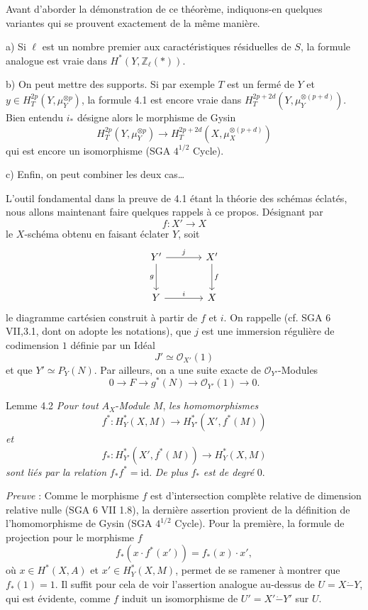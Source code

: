 Avant d'aborder la démonstration de ce théorème, indiquons-en quelques variantes qui se prouvent exactement de la même manière.

a) Si $\ell$ est un nombre premier aux caractéristiques résiduelles de $S$, la formule analogue est vraie dans $H^*(Y,\mathbb{Z}_\ell(*))$.

b) On peut mettre des supports. Si par exemple $T$ est un fermé de $Y$ et $y\in H_T^{2p}(Y,\mu_Y^{\otimes p})$, la formule 4.1 est encore vraie dans $H_T^{2p+2d}(Y,\mu_Y^{\otimes(p+d)})$. Bien entendu $i_*$ désigne alors le morphisme de Gysin
\[
H_T^{2p}(Y,\mu_Y^{\otimes p})
\to H_T^{2p+2d}(X,\mu_X^{\otimes(p+d)})
\]
qui est
encore un isomorphisme (SGA $4^{1/2}$ Cycle).

c) Enfin, on peut combiner les deux cas\dots

L'outil fondamental dans la preuve de 4.1 étant la théorie des schémas éclatés, nous allons maintenant faire quelques rappels à ce propos. Désignant par
\[
f:X'\to X
\]
le $X$-schéma obtenu en faisant éclater $Y$, soit
\[
\begin{tikzcd}[column sep=large,row sep=large]
Y' \arrow[r,"j"] \arrow[d,"g"'] & X' \arrow[d,"f"]\\
Y \arrow[r,"i"] & X
\end{tikzcd}
\]
le diagramme cartésien construit à partir de $f$ et $i$. On rappelle (cf. SGA 6 VII,3.1, dont on adopte les notations), que $j$ est une immersion régulière de codimension $1$ définie par un Idéal
\[
J'\simeq\mathcal{O}_{X'}(1)
\]
et que $Y'\simeq P_Y(N)$. Par ailleurs, on a une suite exacte de $\mathcal{O}_{Y'}$-Modules
\[
0\to F\to g^*(N)\to \mathcal{O}_{Y'}(1)\to0.
\]

\begin{statement}{Lemme 4.2}
\emph{Pour tout} $A_X$-\emph{Module} $M$, \emph{les homomorphismes}
\[
f^*:H_Y^*(X,M)\to H_{Y'}^*(X',f^*(M))
\]
\emph{et}
\[
f_*:H_{Y'}^*(X',f^*(M))\to H_Y^*(X,M)
\]
\emph{sont liés par la relation} $f_*f^*=\mathrm{id}$. \emph{De plus} $f_*$ \emph{est de degré} $0$.
\end{statement}

\emph{Preuve} : Comme le morphisme $f$ est d'intersection complète relative de dimension relative nulle (SGA 6 VII 1.8), la dernière assertion provient de la définition de l'homomorphisme de Gysin (SGA $4^{1/2}$ Cycle). Pour la première, la formule de projection pour le morphisme $f$
\[
f_*(x\cdot f^*(x'))=f_*(x)\cdot x',
\]
où $x\in H^*(X,A)$ et $x'\in H_Y^*(X,M)$,
permet de se ramener à montrer que $f_*(1)=1$. Il suffit pour cela de voir l'assertion analogue au-dessus de $U=X\mathbin{\dot{-}}Y$, qui est évidente, comme $f$ induit un isomorphisme de $U'=X'\mathbin{\dot{-}}Y'$ sur $U$.

